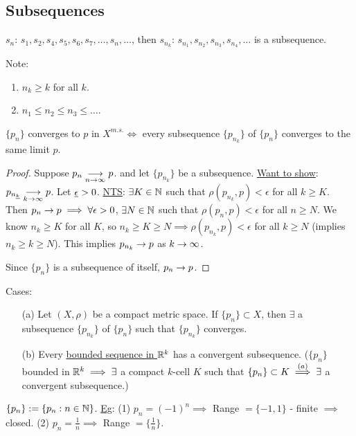 \documentclass[]{article}
\begin{document}
\subsection{Subsequences}

\begin{definition}
	[Sequence] $s_n$: $s_1, s_2, s_4, s_5, s_6, s_7, \dots, s_n, \dots$, then $s_{n_k}$: $s_{n_1}, s_{n_2}, s_{n_3}, s_{n_4}, \dots$ is a subsequence.
	\begin{note}
		Note:
		\begin{enumerate}
			\item $n_k \geq k$ for all $k$.
			\item $n_1 \leq n_2 \leq n_3 \leq \dots$.
		\end{enumerate}
	\end{note}
\end{definition}

\begin{lemma}
	$\{p_n\}$ converges to $p$ in $X^{m.s.} \iff$ every subsequence $\{p_{n_k}\}$ of $\{p_n\}$ converges to the same limit $p$.
\end{lemma}
\begin{proof}
	\say{$\implies$} Suppose $p_n\underset{n\rightarrow\infty}{\longrightarrow}p$. and let $\{p_{n_k}\}$ be a subsequence.
	\ul{Want to show}: $p_{n_{\underline{k}}}\underset{k\rightarrow\infty}{\longrightarrow}p$.
	Let $\underline{\epsilon}>0$. \ul{NTS}: $\exists K\in\mathbb{N}$ such that $\rho(p_{n_k},p) < \epsilon$ for all $k\geq K$.
	Then $p_n\rightarrow p\implies \forall\epsilon>0$, $\exists N\in\mathbb{N}$ such that $\rho(p_n,p) < \epsilon$ for all $n\geq N$.
	We know $n_k \geq K$ for all $K$, so $n_k \geq K \geq N \implies \rho(p_{n_k},p) < \epsilon$ for all $k\geq N$ (implies $n_k\geq k \geq N$).
	This implies $p_{n_k}\rightarrow p$ as $k\rightarrow\infty$.

	\say{$\Lra$} Since $\{p_n\}$ is a subsequence of itself, $p_n\rightarrow p$.
\end{proof}

\begin{theorem}
	Cases:
	\begin{enumerate}
		\item[(a)] Let $(X,\rho)$ be a compact metric space.
			If $\{p_n\}\subset X$, then $\exists$ a subsequence $\{p_{n_k}\}$ of $\{p_n\}$ such that $\{p_{n_k}\}$ converges.
		\item[(b)] Every \ul{bounded sequence in $\mathbb{R}^k$} has a convergent subsequence.
			($\{p_n\}$ bounded in $\mathbb{R}^k \implies \exists$ a compact $k$-cell $K$ such that $\{p_n\}\subset K \overset{(a)}{\implies} \exists$ a convergent subsequence.)
	\end{enumerate}
\end{theorem}
\begin{definition}
	 $\{p_n\} := \{p_n:n\in\mathbb{N}\}$. \ul{Eg}: (1) $p_n = (-1)^n \implies$ Range $ = \{-1,1\}$ - finite $\implies$ closed. (2) $p_n = \frac{1}{n} \implies $ Range $ = \{\frac{1}{n}\}$.
\end{definition}
\end{document}
